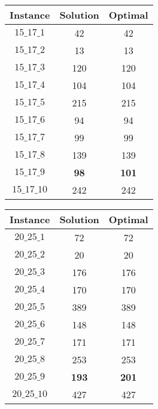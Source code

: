\documentclass[a4paper, 11pt]{article} %
\begin{document}
\begin{center}
\begin{figure}[H]
   \begin{minipage}[c]{.46\linewidth}
      \begin{tabular}{|c|c|c|}
      \hline 
        Instance & Solution & Optimal  \\ \hline
        $15\_17\_1$ & 42  & 42  \\ \hline
        $15\_17\_2$ & 13  & 13  \\ \hline
        $15\_17\_3$ & 120  & 120  \\ \hline
        $15\_17\_4$ & 104  & 104  \\ \hline
        $15\_17\_5$ & 215  & 215  \\ \hline
        $15\_17\_6$ & 94  & 94  \\ \hline
        $15\_17\_7$ & 99  & 99  \\ \hline
        $15\_17\_8$ & 139  & 139  \\ \hline
        $15\_17\_9$ & \textbf{98}  & \textbf{101}  \\ \hline
        $15\_17\_10$ & 242 & 242  \\ \hline
      \end{tabular}
   \end{minipage} \hfill
   \begin{minipage}[c]{.46\linewidth}
      \begin{tabular}{|c|c|c|}
      \hline 
        Instance & Solution & Optimal  \\ \hline
        $20\_25\_1$ & 72  & 72  \\ \hline
        $20\_25\_2$ & 20  & 20  \\ \hline
        $20\_25\_3$ & 176  & 176  \\ \hline
        $20\_25\_4$ & 170  & 170  \\ \hline
        $20\_25\_5$ & 389  & 389  \\ \hline
        $20\_25\_6$ & 148  & 148  \\ \hline
        $20\_25\_7$ & 171  & 171  \\ \hline
        $20\_25\_8$ & 253  & 253  \\ \hline
        $20\_25\_9$ & \textbf{193}  & \textbf{201}  \\ \hline
        $20\_25\_10$ & 427 & 427  \\ \hline
      \end{tabular}
   \end{minipage}
\end{figure}


\end{center}
\end{document}
